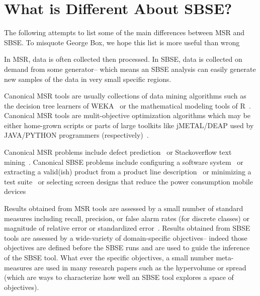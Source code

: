 \documentclass[table, xcdraw, sigconf,review, anonymous]{acmart}
\begin{document}
\section{What is Different About SBSE?}

The following  attempts to list
some of the main differences between MSR and SBSE.
To  misquote George Box, we hope this list is
 more useful than 
wrong

 


In MSR,  data is often collected then processed.
In SBSE,  data is collected on demand
from  some generator-- which means an SBSE analysis can easily
generate new samples of the data in very small specific regions.


Canonical MSR tools are usually collections of
data mining algorithms such as the decision
tree learners of WEKA~\cite{xx} or the mathematical modeling tools of R~\cite{xx}.
Canonical MSR tools are mulit-objective optimization algorithms which may be either home-grown scripts or parts of large toolkits like jMETAL/DEAP used by JAVA/PYTHON programmers (respectively)~\cite{refs2jmetalDEE}.

Canonical MSR problems include defect prediction~\cite{lessmann2008benchmarking}   or Stackoverflow text mining~\cite{fu2017easy}. 
Canonical SBSE problems include configuring a software system~\cite{nair2017faster} or extracting a valid(ish) product from a product line description~\cite{sayyad13b} or minimizing a test suite~\cite{fraserXXX} or selecting screen designs that
reduce the power consumption  mobile devices


Results obtained from
MSR tools are assessed by a small number of standard measures
including   recall, precision, or false alarm rates (for discrete classes)
or magnitude of relative error or standardized error~\cite{Shepperd2012}.
Results obtained from SBSE tools are assessed by a wide-variety of domain-specific objectives-- indeed those objectives are defined before the SBSE
runs and are used to guide the inference of the SBSE tool.
What ever the specific objectives, a small number meta-measures are used in many research papers such as the hypervolume or spread (which are ways to characterize how well an SBSE tool explores a space of objectives). 





 
\end{document}
